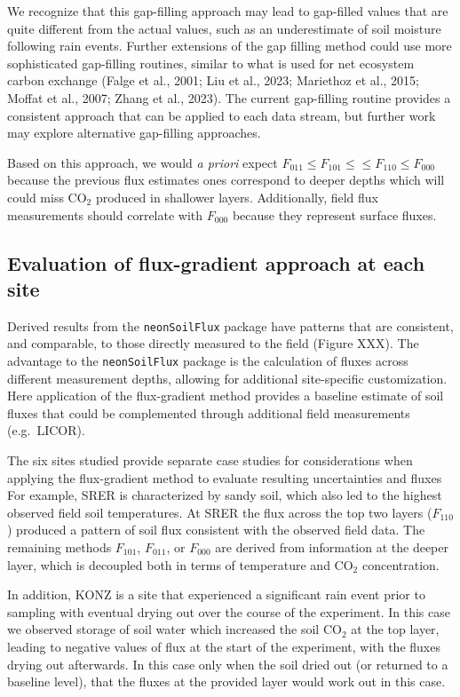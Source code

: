 \documentclass[
  letterpaper,
  DIV=11,
  numbers=noendperiod]{scrartcl}
\begin{document}
We recognize that this gap-filling approach may lead to gap-filled
values that are quite different from the actual values, such as an
underestimate of soil moisture following rain events. Further extensions
of the gap filling method could use more sophisticated gap-filling
routines, similar to what is used for net ecosystem carbon exchange
(Falge et al., 2001; Liu et al., 2023; Mariethoz et al., 2015; Moffat et
al., 2007; Zhang et al., 2023). The current gap-filling routine provides
a consistent approach that can be applied to each data stream, but
further work may explore alternative gap-filling approaches.

Based on this approach, we would \emph{a priori} expect
\(F_{011} \leq F_{101} \leq \leq F_{110} \leq F_{000}\) because the
previous flux estimates ones correspond to deeper depths which will
could miss CO\(_{2}\) produced in shallower layers. Additionally, field
flux measurements should correlate with \(F_{000}\) because they
represent surface fluxes.

\subsection{Evaluation of flux-gradient approach at each
site}\label{evaluation-of-flux-gradient-approach-at-each-site}

Derived results from the \texttt{neonSoilFlux} package have patterns
that are consistent, and comparable, to those directly measured to the
field (Figure XXX). The advantage to the \texttt{neonSoilFlux} package
is the calculation of fluxes across different measurement depths,
allowing for additional site-specific customization. Here application of
the flux-gradient method provides a baseline estimate of soil fluxes
that could be complemented through additional field measurements
(e.g.~LICOR).

The six sites studied provide separate case studies for considerations
when applying the flux-gradient method to evaluate resulting
uncertainties and fluxes For example, SRER is characterized by sandy
soil, which also led to the highest observed field soil temperatures. At
SRER the flux across the top two layers (\(F_{110}\)) produced a pattern
of soil flux consistent with the observed field data. The remaining
methods \(F_{101}\), \(F_{011}\), or \(F_{000}\) are derived from
information at the deeper layer, which is decoupled both in terms of
temperature and CO\(_{2}\) concentration.

In addition, KONZ is a site that experienced a significant rain event
prior to sampling with eventual drying out over the course of the
experiment. In this case we observed storage of soil water which
increased the soil CO\(_{2}\) at the top layer, leading to negative
values of flux at the start of the experiment, with the fluxes drying
out afterwards. In this case only when the soil dried out (or returned
to a baseline level), that the fluxes at the provided layer would work
out in this case.
\end{document}
